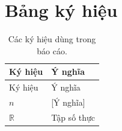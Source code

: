 \chapter{Bảng ký hiệu}\label{appendix:notation}
\pagestyle{fancy}

\begin{longtable}{@{}p{} p{}@{}}
\caption{Các ký hiệu dùng trong báo cáo.}\label{tab:notation}\\
\toprule
Ký hiệu & Ý nghĩa \\
\midrule
\endfirsthead
\toprule
Ký hiệu & Ý nghĩa \\
\midrule
\endhead
\bottomrule
\endfoot
$n$ & [Ý nghĩa] \\
$\mathbb{R}$ & Tập số thực \\
\end{longtable}

